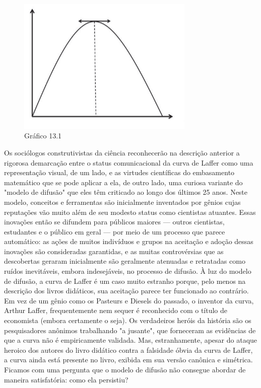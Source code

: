 \documentclass[a4paper,12pt]{article}[abntex2]
\begin{document}
\begin{figure}[H]
    \centering
    \caption{Gráfico 13.1}
    \includegraphics[width=0.75\textwidth]{4º Período/História do Pensamento Econômico/Tradução HPE/Tradução Tópico 9.3/figura 1.png}
    \end{figure}

Os sociólogos construtivistas da ciência reconhecerão na descrição anterior a rigorosa demarcação entre o status comunicacional da curva de Laffer como uma representação visual, de um lado, e as virtudes científicas do embasamento matemático que se pode aplicar a ela, de outro lado, uma curiosa variante do "modelo de difusão" que eles têm criticado ao longo dos últimos 25 anos. Neste modelo, conceitos e ferramentas são inicialmente inventados por gênios cujas reputações vão muito além de seu modesto status como cientistas atuantes. Essas inovações então se difundem para públicos maiores — outros cientistas, estudantes e o público em geral — por meio de um processo que parece automático: as ações de muitos indivíduos e grupos na aceitação e adoção dessas inovações são consideradas garantidas, e as muitas controvérsias que as descobertas geraram inicialmente são geralmente atenuadas e retratadas como ruídos inevitáveis, embora indesejáveis, no processo de difusão. À luz do modelo de difusão, a curva de Laffer é um caso muito estranho porque, pelo menos na descrição dos livros didáticos, sua aceitação parece ter funcionado ao contrário. Em vez de um gênio como os Pasteurs e Diesels do passado, o inventor da curva, Arthur Laffer, frequentemente nem sequer é reconhecido com o título de economista (embora certamente o seja). Os verdadeiros heróis da história são os pesquisadores anônimos trabalhando "a jusante", que forneceram as evidências de que a curva não é empiricamente validada. Mas, estranhamente, apesar do ataque heroico dos autores do livro didático contra a falsidade óbvia da curva de Laffer, a curva ainda está presente no livro, exibida em sua versão canônica e simétrica. Ficamos com uma pergunta que o modelo de difusão não consegue abordar de maneira satisfatória: como ela persistiu?
\end{document}
